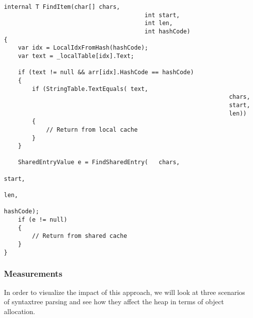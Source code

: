 \begin{lstlisting}
internal T FindItem(char[] chars, 
										int start, 
										int len, 
										int hashCode)
{
	var idx = LocalIdxFromHash(hashCode);
	var text = _localTable[idx].Text;

	if (text != null && arr[idx].HashCode == hashCode)
	{
		if (StringTable.TextEquals(	text, 
																chars, 
																start, 
																len))
		{
			// Return from local cache
		}
	}

	SharedEntryValue e = FindSharedEntry(	chars, 
																				start, 
																				len, 
																				hashCode);
	if (e != null)
	{
		// Return from shared cache
	}
}
\end{lstlisting}

\subsubsection{Measurements}
\label{sec:re-use-measurements}

In order to visualize the impact of this approach, we will look at three scenarios of \gls{syntaxtree} parsing and see how they affect the heap in terms of object allocation.

